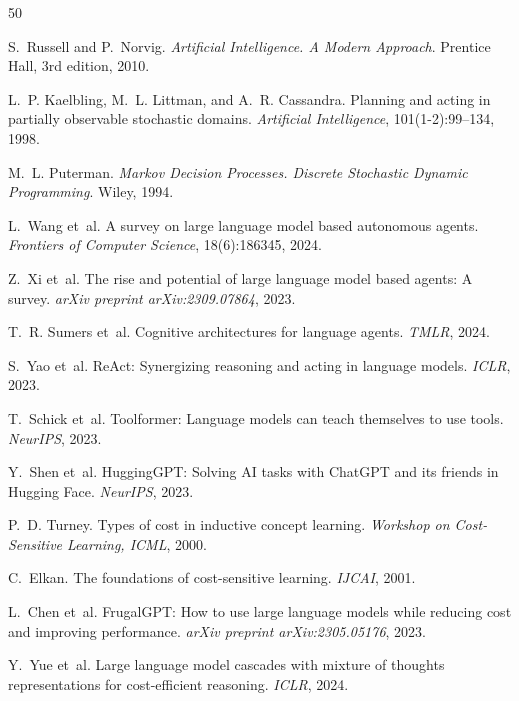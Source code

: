 \documentclass[11pt]{book}
\begin{document}
\begin{thebibliography}{50}

S.~Russell and P.~Norvig.
\newblock \emph{Artificial Intelligence. A Modern Approach}.
\newblock Prentice Hall, 3rd edition, 2010.

L.~P. Kaelbling, M.~L. Littman, and A.~R. Cassandra.
\newblock Planning and acting in partially observable stochastic domains.
\newblock \emph{Artificial Intelligence}, 101(1-2):99--134, 1998.

M.~L. Puterman.
\newblock \emph{Markov Decision Processes. Discrete Stochastic Dynamic Programming}.
\newblock Wiley, 1994.

L.~Wang et~al.
\newblock A survey on large language model based autonomous agents.
\newblock \emph{Frontiers of Computer Science}, 18(6):186345, 2024.

Z.~Xi et~al.
\newblock The rise and potential of large language model based agents: A survey.
\newblock \emph{arXiv preprint arXiv:2309.07864}, 2023.

T.~R. Sumers et~al.
\newblock Cognitive architectures for language agents.
\newblock \emph{TMLR}, 2024.

S.~Yao et~al.
\newblock ReAct: Synergizing reasoning and acting in language models.
\newblock \emph{ICLR}, 2023.

T.~Schick et~al.
\newblock Toolformer: Language models can teach themselves to use tools.
\newblock \emph{NeurIPS}, 2023.

Y.~Shen et~al.
\newblock HuggingGPT: Solving AI tasks with ChatGPT and its friends in Hugging Face.
\newblock \emph{NeurIPS}, 2023.

P.~D. Turney.
\newblock Types of cost in inductive concept learning.
\newblock \emph{Workshop on Cost-Sensitive Learning, ICML}, 2000.

C.~Elkan.
\newblock The foundations of cost-sensitive learning.
\newblock \emph{IJCAI}, 2001.

L.~Chen et~al.
\newblock FrugalGPT: How to use large language models while reducing cost and improving performance.
\newblock \emph{arXiv preprint arXiv:2305.05176}, 2023.

Y.~Yue et~al.
\newblock Large language model cascades with mixture of thoughts representations for cost-efficient reasoning.
\newblock \emph{ICLR}, 2024.


\end{thebibliography}
\end{document}

